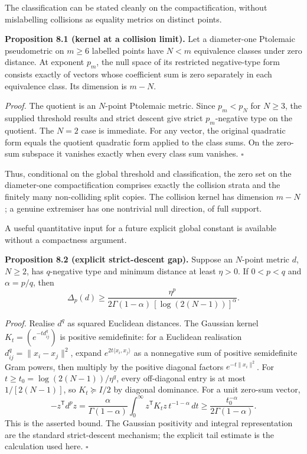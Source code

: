 \documentclass[11pt,a4paper]{article}
\begin{document}
The classification can be stated cleanly on the compactification,
without mislabelling collisions as equality metrics on distinct points.

\textbf{Proposition 8.1 (kernel at a collision limit).} Let a
diameter-one Ptolemaic pseudometric on \(m\ge6\) labelled points have
\(N<m\) equivalence classes under zero distance. At exponent \(p_m\),
the null space of its restricted negative-type form consists exactly of
vectors whose coefficient sum is zero separately in each equivalence
class. Its dimension is \(m-N\).

\emph{Proof.} The quotient is an \(N\)-point Ptolemaic metric. Since
\(p_m<p_N\) for \(N\ge3\), the supplied threshold results and strict
descent give strict \(p_m\)-negative type on the quotient. The \(N=2\)
case is immediate. For any vector, the original quadratic form equals
the quotient quadratic form applied to the class sums. On the zero-sum
subspace it vanishes exactly when every class sum vanishes. \(\square\)

Thus, conditional on the global threshold and classification, the zero
set on the diameter-one compactification comprises exactly the collision
strata and the finitely many non-colliding split copies. The collision
kernel has dimension \(m-N\); a genuine extremiser has one nontrivial
null direction, of full support.

A useful quantitative input for a future explicit global constant is
available without a compactness argument.

\textbf{Proposition 8.2 (explicit strict-descent gap).} Suppose an
\(N\)-point metric \(d\), \(N\ge2\), has \(q\)-negative type and minimum
distance at least \(\eta>0\). If \(0<p<q\) and \(\alpha=p/q\), then
\[\boxed{\Delta_p(d)\ge
\frac{\eta^p}{2\Gamma(1-\alpha)\,[\log(2(N-1))]^\alpha}.}\]

\emph{Proof.} Realise \(d^q\) as squared Euclidean distances. The
Gaussian kernel \(K_t=(e^{-td_{ij}^q})\) is positive semidefinite: for a
Euclidean realisation \(d_{ij}^q=\|x_i-x_j\|^2\), expand
\(e^{2t\langle x_i,x_j\rangle}\) as a nonnegative sum of positive
semidefinite Gram powers, then multiply by the positive diagonal factors
\(e^{-t\|x_i\|^2}\). For \(t\ge t_0=\log(2(N-1))/\eta^q\), every
off-diagonal entry is at most \(1/[2(N-1)]\), so \(K_t\succeq I/2\) by
diagonal dominance. For a unit zero-sum vector, \[-z^{\mathsf T}d^p z
=\frac{\alpha}{\Gamma(1-\alpha)}
\int_0^\infty z^{\mathsf T}K_tz\,t^{-1-\alpha}\,dt
\ge\frac{t_0^{-\alpha}}{2\Gamma(1-\alpha)}.\] This is the asserted
bound. The Gaussian positivity and integral representation are the
standard strict-descent mechanism; the explicit tail estimate is the
calculation used here. \(\square\)
\end{document}

